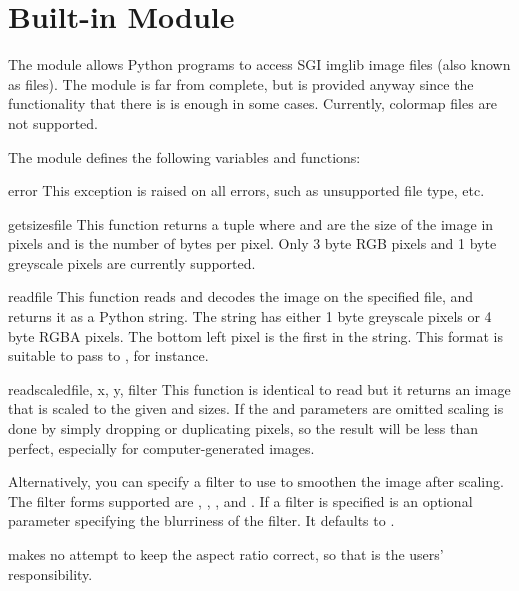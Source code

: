 \section{Built-in Module }



The  module allows Python programs to access SGI imglib image
files (also known as  files).  The module is far from
complete, but is provided anyway since the functionality that there is
is enough in some cases.  Currently, colormap files are not supported.

The module defines the following variables and functions:

\begin{excdesc}{error}
This exception is raised on all errors, such as unsupported file type, etc.
\end{excdesc}

\begin{funcdesc}{getsizes}{file}
This function returns a tuple  where
 and  are the size of the image in pixels and
 is the number of
bytes per pixel. Only 3 byte RGB pixels and 1 byte greyscale pixels
are currently supported.
\end{funcdesc}

\begin{funcdesc}{read}{file}
This function reads and decodes the image on the specified file, and
returns it as a Python string. The string has either 1 byte greyscale
pixels or 4 byte RGBA pixels. The bottom left pixel is the first in
the string. This format is suitable to pass to ,
for instance.
\end{funcdesc}

\begin{funcdesc}{readscaled}{file, x, y, filter}
This function is identical to read but it returns an image that is
scaled to the given  and  sizes. If the  and
 parameters are omitted scaling is done by
simply dropping or duplicating pixels, so the result will be less than
perfect, especially for computer-generated images.

Alternatively, you can specify a filter to use to smoothen the image
after scaling. The filter forms supported are ,
, ,  and
. If a filter is specified  is an optional
parameter specifying the blurriness of the filter. It defaults to .

 makes no attempt to keep the aspect ratio
correct, so that is the users' responsibility.
\end{funcdesc}

